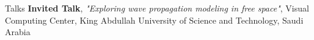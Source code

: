 \begin{rubric}{Talks}
    \entry*[2024/05] \textbf{Invited Talk}, \textit{"Exploring wave propagation modeling in free space"}, Visual Computing Center, King Abdullah University of Science and Technology, Saudi Arabia
\end{rubric}